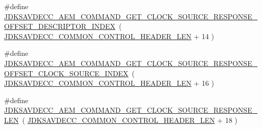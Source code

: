 \begin{DoxyCompactItemize}
\item 
\#define \hyperlink{group__command__get__clock__source__response_ga59ba0eb400a72de784cd7e65c3acaf05}{J\+D\+K\+S\+A\+V\+D\+E\+C\+C\+\_\+\+A\+E\+M\+\_\+\+C\+O\+M\+M\+A\+N\+D\+\_\+\+G\+E\+T\+\_\+\+C\+L\+O\+C\+K\+\_\+\+S\+O\+U\+R\+C\+E\+\_\+\+R\+E\+S\+P\+O\+N\+S\+E\+\_\+\+O\+F\+F\+S\+E\+T\+\_\+\+D\+E\+S\+C\+R\+I\+P\+T\+O\+R\+\_\+\+I\+N\+D\+EX}~( \hyperlink{group__jdksavdecc__avtp__common__control__header_gaae84052886fb1bb42f3bc5f85b741dff}{J\+D\+K\+S\+A\+V\+D\+E\+C\+C\+\_\+\+C\+O\+M\+M\+O\+N\+\_\+\+C\+O\+N\+T\+R\+O\+L\+\_\+\+H\+E\+A\+D\+E\+R\+\_\+\+L\+EN} + 14 )
\item 
\#define \hyperlink{group__command__get__clock__source__response_ga6e8597483bfa45d6cb7cec7b4d7a0b30}{J\+D\+K\+S\+A\+V\+D\+E\+C\+C\+\_\+\+A\+E\+M\+\_\+\+C\+O\+M\+M\+A\+N\+D\+\_\+\+G\+E\+T\+\_\+\+C\+L\+O\+C\+K\+\_\+\+S\+O\+U\+R\+C\+E\+\_\+\+R\+E\+S\+P\+O\+N\+S\+E\+\_\+\+O\+F\+F\+S\+E\+T\+\_\+\+C\+L\+O\+C\+K\+\_\+\+S\+O\+U\+R\+C\+E\+\_\+\+I\+N\+D\+EX}~( \hyperlink{group__jdksavdecc__avtp__common__control__header_gaae84052886fb1bb42f3bc5f85b741dff}{J\+D\+K\+S\+A\+V\+D\+E\+C\+C\+\_\+\+C\+O\+M\+M\+O\+N\+\_\+\+C\+O\+N\+T\+R\+O\+L\+\_\+\+H\+E\+A\+D\+E\+R\+\_\+\+L\+EN} + 16 )
\item 
\#define \hyperlink{group__command__get__clock__source__response_gab6cf3d1066d1ef1a9402ece809e38de4}{J\+D\+K\+S\+A\+V\+D\+E\+C\+C\+\_\+\+A\+E\+M\+\_\+\+C\+O\+M\+M\+A\+N\+D\+\_\+\+G\+E\+T\+\_\+\+C\+L\+O\+C\+K\+\_\+\+S\+O\+U\+R\+C\+E\+\_\+\+R\+E\+S\+P\+O\+N\+S\+E\+\_\+\+L\+EN}~( \hyperlink{group__jdksavdecc__avtp__common__control__header_gaae84052886fb1bb42f3bc5f85b741dff}{J\+D\+K\+S\+A\+V\+D\+E\+C\+C\+\_\+\+C\+O\+M\+M\+O\+N\+\_\+\+C\+O\+N\+T\+R\+O\+L\+\_\+\+H\+E\+A\+D\+E\+R\+\_\+\+L\+EN} + 18 )
\end{DoxyCompactItemize}
